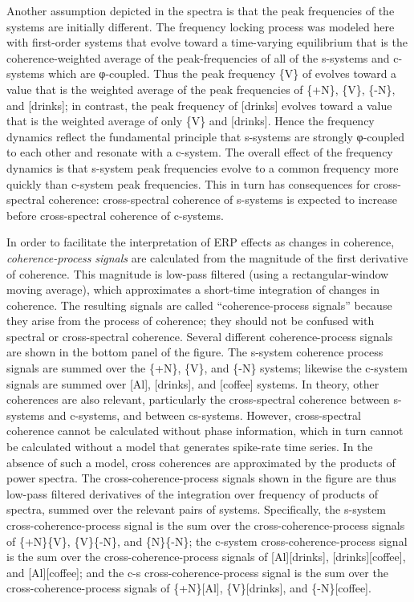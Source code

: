 Another assumption depicted in the spectra is that the peak frequencies of the systems are initially different. The frequency locking process was modeled here with first-order systems that evolve toward a time-varying equilibrium that is the coherence-weighted average of the peak-frequencies of all of the s-systems and c-systems which are φ-coupled. Thus the peak frequency \{V\} of evolves toward a value that is the weighted average of the peak frequencies of \{+N\}, \{V\}, \{-N\}, and [drinks]; in contrast, the peak frequency of [drinks] evolves toward a value that is the weighted average of only \{V\} and [drinks]. Hence the frequency dynamics reflect the fundamental principle that s-systems are strongly φ-coupled to each other and resonate with a c-system. The overall effect of the frequency dynamics is that s-system peak frequencies evolve to a common frequency more quickly than c-system peak frequencies. This in turn has consequences for cross-spectral coherence: cross-spectral coherence of s-systems is expected to increase before cross-spectral coherence of c-systems.

  In order to facilitate the interpretation of ERP effects as changes in coherence, \textit{coherence-process} \textit{signals} are calculated from the magnitude of the first derivative of coherence. This magnitude is low-pass filtered (using a rectangular-window moving average), which approximates a short-time integration of changes in coherence. The resulting signals are called “coherence-process signals” because they arise from the process of coherence; they should not be confused with spectral or cross-spectral coherence. Several different coherence-process signals are shown in the bottom panel of the figure. The s-system coherence process signals are summed over the \{+N\}, \{V\}, and \{-N\} systems; likewise the c-system signals are summed over [Al], [drinks], and [coffee] systems. In theory, other coherences are also relevant, particularly the cross-spectral coherence between s-systems and c-systems, and between cs-systems. However, cross-spectral coherence cannot be calculated without phase information, which in turn cannot be calculated without a model that generates spike-rate time series. In the absence of such a model, cross coherences are approximated by the products of power spectra. The cross-coherence-process signals shown in the figure are thus low-pass filtered derivatives of the integration over frequency of products of spectra, summed over the relevant pairs of systems. Specifically, the s-system cross-coherence-process signal is the sum over the cross-coherence-process signals of \{+N\}\{V\}, \{V\}\{-N\}, and \{N\}\{-N\}; the c-system cross-coherence-process signal is the sum over the cross-coherence-process signals of [Al][drinks], [drinks][coffee], and [Al][coffee]; and the c-s cross-coherence-process signal is the sum over the cross-coherence-process signals of \{+N\}[Al], \{V\}[drinks], and \{-N\}[coffee]. 

